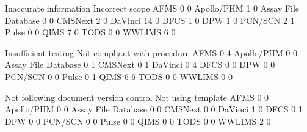 \documentclass{article}
\begin{document}
\begin{Schunk}
\begin{Soutput}
                      Inaccurate information Incorrect scope
  AFMS                                     0               0
  Apollo/PHM                               1               0
  Assay File Database                      0               0
  CMSNext                                  2               0
  DaVinci                                 14               0
  DFCS                                     1               0
  DPW                                      1               0
  PCN/SCN                                  2               1
  Pulse                                    0               0
  QIMS                                     7               0
  TODS                                     0               0
  WWLIMS                                   6               0
                     
                      Insufficient testing Not compliant with procedure
  AFMS                                   0                            4
  Apollo/PHM                             0                            0
  Assay File Database                    0                            1
  CMSNext                                0                            1
  DaVinci                                0                            4
  DFCS                                   0                            0
  DPW                                    0                            0
  PCN/SCN                                0                            0
  Pulse                                  0                            1
  QIMS                                   6                            6
  TODS                                   0                            0
  WWLIMS                                 0                            0
                     
                      Not following document version control Not using template
  AFMS                                                     0                  0
  Apollo/PHM                                               0                  0
  Assay File Database                                      0                  0
  CMSNext                                                  0                  0
  DaVinci                                                  1                  0
  DFCS                                                     0                  1
  DPW                                                      0                  0
  PCN/SCN                                                  0                  0
  Pulse                                                    0                  0
  QIMS                                                     0                  0
  TODS                                                     0                  0
  WWLIMS                                                   2                  0
                     

\end{Soutput}
\end{Schunk}
\end{document}
